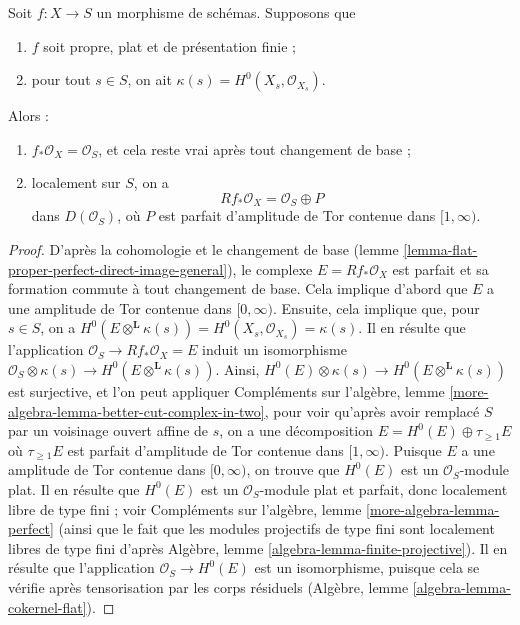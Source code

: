 \begin{lemma}
\label{lemma-proper-flat-h0}
Soit $f : X \to S$ un morphisme de schémas. Supposons que
\begin{enumerate}
\item $f$ soit propre, plat et de présentation finie ;
\item pour tout $s \in S$, on ait $\kappa(s) = H^0(X_s, \mathcal{O}_{X_s})$.
\end{enumerate}
Alors :
\begin{enumerate}
\item[(a)] $f_*\mathcal{O}_X = \mathcal{O}_S$, et
cela reste vrai après tout changement de base ;
\item[(b)] localement sur $S$, on a
$$
Rf_*\mathcal{O}_X = \mathcal{O}_S \oplus P
$$
dans $D(\mathcal{O}_S)$,
où $P$ est parfait d'amplitude de Tor contenue dans $[1, \infty)$.
\end{enumerate}
\end{lemma}

\begin{proof}
D'après la cohomologie et le changement de base
(lemme \ref{lemma-flat-proper-perfect-direct-image-general}),
le complexe $E = Rf_*\mathcal{O}_X$
est parfait et sa formation commute à tout changement de base.
Cela implique d'abord que $E$ a une amplitude de Tor contenue dans $[0, \infty)$.
Ensuite, cela implique que, pour $s \in S$, on a
$H^0(E \otimes^\mathbf{L} \kappa(s)) =
H^0(X_s, \mathcal{O}_{X_s}) = \kappa(s)$.
Il en résulte que l'application $\mathcal{O}_S \to Rf_*\mathcal{O}_X = E$
induit un isomorphisme
$\mathcal{O}_S \otimes \kappa(s) \to H^0(E \otimes^\mathbf{L} \kappa(s))$.
Ainsi, $H^0(E) \otimes \kappa(s) \to H^0(E \otimes^\mathbf{L} \kappa(s))$
est surjective, et l'on peut appliquer
Compléments sur l'algèbre, lemme \ref{more-algebra-lemma-better-cut-complex-in-two},
pour voir qu'après avoir remplacé $S$ par un voisinage ouvert affine de $s$,
on a une décomposition $E = H^0(E) \oplus \tau_{\geq 1}E$
où $\tau_{\geq 1}E$ est parfait d'amplitude de Tor contenue dans $[1, \infty)$.
Puisque $E$ a une amplitude de Tor contenue dans $[0, \infty)$, on trouve que
$H^0(E)$ est un $\mathcal{O}_S$-module plat.
Il en résulte que $H^0(E)$ est un $\mathcal{O}_S$-module plat et parfait,
donc localement libre de type fini ; voir
Compléments sur l'algèbre, lemme \ref{more-algebra-lemma-perfect}
(ainsi que le fait que les modules projectifs de type fini sont localement libres de type fini d'après
Algèbre, lemme \ref{algebra-lemma-finite-projective}).
Il en résulte que l'application $\mathcal{O}_S \to H^0(E)$ est
un isomorphisme, puisque cela se vérifie après tensorisation par les
corps résiduels (Algèbre, lemme \ref{algebra-lemma-cokernel-flat}).
\end{proof}

